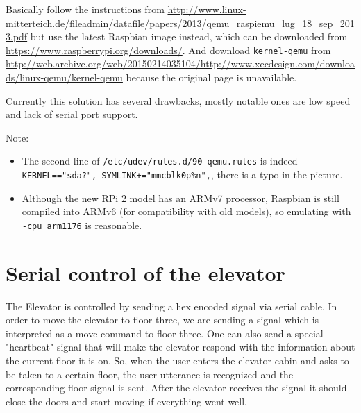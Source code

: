 \documentclass[a4paper, 12pt]{article}
\begin{document}
Basically follow the instructions from \url{http://www.linux-mitterteich.de/fileadmin/datafile/papers/2013/qemu_raspiemu_lug_18_sep_2013.pdf} but use the latest Raspbian image instead, which can be downloaded from \url{https://www.raspberrypi.org/downloads/}.
And download \texttt{kernel-qemu} from \url{http://web.archive.org/web/20150214035104/http://www.xecdesign.com/downloads/linux-qemu/kernel-qemu} because the original page is unavailable.

Currently this solution has several drawbacks, mostly notable ones are low speed and lack of serial port support.

\vspace{\baselineskip}

Note:

\begin{itemize}
\item The second line of \texttt{/etc/udev/rules.d/90-qemu.rules} is indeed \texttt{KERNEL=="sda?", SYMLINK+="mmcblk0p\%n",}, there is a typo in the picture.
\item Although the new RPi 2 model has an ARMv7 processor, Raspbian is still compiled into ARMv6 (for compatibility with old models), so emulating with \texttt{-cpu arm1176} is reasonable.
\end{itemize}

\section{Serial control of the elevator}
\label{sec:Serial_control_of_the_elevator}
The Elevator is controlled by sending a hex encoded signal via serial cable.
In order to move the elevator to floor three, we are sending a signal which is interpreted as a move command to floor three.
One can also send a special "heartbeat" signal that will make the elevator respond with the information about the current floor it is on.
So, when the user enters the elevator cabin and asks to be taken to a certain floor, the user utterance is recognized and the corresponding floor signal is sent.
After the elevator receives the signal it should close the doors and start moving if everything went well.

\end{document}
